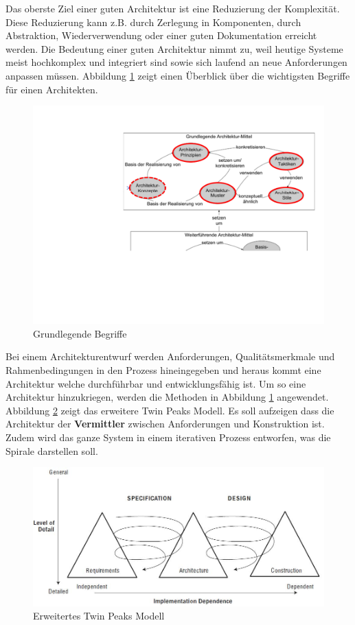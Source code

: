 Das oberste Ziel einer guten Architektur ist eine Reduzierung der Komplexität. Diese Reduzierung kann z.B. durch Zerlegung in Komponenten, durch Abstraktion, Wiederverwendung oder einer guten Dokumentation erreicht werden. Die Bedeutung einer guten Architektur nimmt zu, weil heutige Systeme meist hochkomplex und integriert sind sowie sich laufend an neue Anforderungen anpassen müssen. Abbildung \ref{fig:begriffe} zeigt einen Überblick über die wichtigsten Begriffe für einen Architekten.

\begin{figure}
\centering
\includegraphics[width=0.6\linewidth]{fig/begriffe}
\caption{Grundlegende Begriffe}
\label{fig:begriffe}
\end{figure}

Bei einem Architekturentwurf werden Anforderungen, Qualitätsmerkmale und Rahmenbedingungen in den Prozess hineingegeben und heraus kommt eine Architektur welche durchführbar und entwicklungsfähig ist. Um so eine Architektur hinzukriegen, werden die Methoden in Abbildung \ref{fig:begriffe} angewendet. Abbildung \ref{fig:twin-peaks} zeigt das erweitere Twin Peaks Modell. Es soll aufzeigen dass die Architektur der \textbf{Vermittler} zwischen Anforderungen und Konstruktion ist. Zudem wird das ganze System in einem iterativen Prozess entworfen, was die Spirale darstellen soll.

\begin{figure}
\centering
\includegraphics[width=0.7\linewidth]{fig/twin-peaks}
\caption{Erweitertes Twin Peaks Modell}
\label{fig:twin-peaks}
\end{figure}

